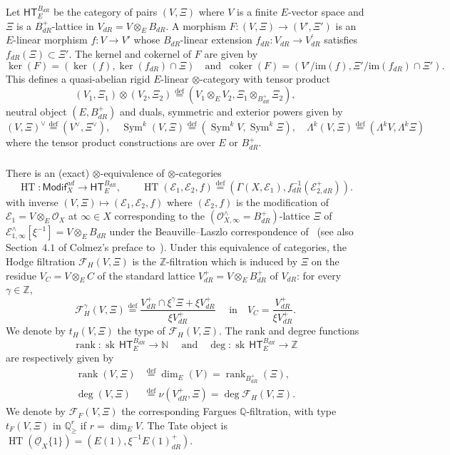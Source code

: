 \documentclass[11pt]{article}
\theoremstyle{definition}
\numberwithin{equation}{section}
\numberwithin{figure}{section}
\numberwithin{table}{section}
\newcommand{\Modif}{\mathsf{Modif}}
\newcommand{\HT}{\mathsf{HT}}
\DeclareMathOperator{\coker}{coker}
\DeclareMathOperator{\rank}{rank}
\DeclareMathOperator{\sk}{sk}
\DeclareMathOperator{\Sym}{Sym}
\DeclareMathOperator{\HTT}{HT}
\newcommand{\eqd}{\stackrel{\mathrm{def}}{=}}
\newcommand*{\dR}{dR}
\begin{document}
Let $\HT_{E}^{B_{\dR}}$ be the category of pairs $(V,\Xi)$ where $V$ is a finite $E$-vector space and $\Xi$ is a $B_{\dR}^{+}$-lattice in $V_{\dR}=V\otimes_{E}B_{\dR}$. A morphism $F:(V,\Xi)\rightarrow(V',\Xi')$ is an $E$-linear morphism $f:V\rightarrow V'$ whose $B_{\dR}$-linear extension $f_{\dR}:V_{\dR}\rightarrow V_{\dR}^{\prime}$ satisfies $f_{\dR}(\Xi)\subset\Xi'$. The kernel and cokernel of $F$ are given by
\[
\ker(F)=\left(\ker(f),\ker(f_{\dR})\cap\Xi\right)\quad\text{and}\;\;\coker(F)=\left(V'/\mathrm{im}(f),\Xi'/\mathrm{im}(f_{\dR})\cap\Xi'\right).
\]
This defines a quasi-abelian rigid $E$-linear $\otimes$-category with tensor product
\[
(V_{1},\Xi_{1})\otimes(V_{2},\Xi_{2})\eqd(V_{1}\otimes_{E}V_{2},\Xi_{1}\otimes_{B_{\dR}^{+}}\Xi_{2}),
\]
neutral object $(E,B_{\dR}^{+})$ and duals, symmetric and exterior powers given by
\[
(V,\Xi)^{\vee}\eqd(V^{\vee},\Xi^{\vee}),\quad\Sym^{k}(V,\Xi)\eqd(\Sym^{k}V,\Sym^{k}\Xi),\quad\Lambda^{k}(V,\Xi)\eqd(\Lambda^{k}V,\Lambda^{k}\Xi)
\]
where the tensor product constructions are over $E$ or $B_{\dR}^{+}$.

\subsubsection{}

There is an (exact) $\otimes$-equivalence of $\otimes$-categories~\cite[4.2.3]{Fa15}
\[
\HTT:\Modif_{X}^{ad}\rightarrow\HT_{E}^{B_{\dR}},\qquad\HTT(\mathcal{E}_{1},\mathcal{E}_{2},f)\eqd\left(\Gamma(X,\mathcal{E}_{1}),f_{\dR}^{-1}(\mathcal{E}_{2,\dR}^{+})\right).
\]
with inverse $(V,\Xi)\mapsto(\mathcal{E}_{1},\mathcal{E}_{2},f)$ where $(\mathcal{E}_{2},f)$ is the modification of $\mathcal{E}_{1}=V\otimes_{E}\mathcal{O}_{X}$ at $\infty\in X$ corresponding to the $(\mathcal{O}_{X,\infty}^{\wedge}=B_{\dR}^{+})$-lattice $\Xi$ of $\mathcal{E}_{1,\infty}^{\wedge}[\xi^{-1}]=V\otimes_{E}B_{\dR}$ under the Beauville--Laszlo correspondence of~\cite[5.3.1]{FaFo15} (see also Section~$4.1$ of Colmez's preface to~\cite{FaFo15}). Under this equivalence of categories, the Hodge filtration $\mathcal{F}_{H}(V,\Xi)$ is the $\mathbb{Z}$-filtration which is induced by $\Xi$ on the residue $V_{C}=V\otimes_{E}C$ of the standard lattice $V_{\dR}^{+}=V\otimes_{E}B_{\dR}^{+}$ of $V_{\dR}$: for every $\gamma\in\mathbb{Z}$,
\[
\mathcal{F}_{H}^{\gamma}(V,\Xi)\eqd\frac{V_{\dR}^{+}\cap\xi^{\gamma}\Xi+\xi V_{\dR}^{+}}{\xi V_{\dR}^{+}}\quad\text{ in}\quad V_{C}=\frac{V_{\dR}^{+}}{\xi V_{\dR}^{+}}.
\]
We denote by $t_{H}(V,\Xi)$ the type of $\mathcal{F}_{H}(V,\Xi)$. The rank and degree functions
\[
\rank:\sk\,\HT_{E}^{B_{\dR}}\rightarrow\mathbb{N}\quad\text{ and}\quad\deg:\sk\,\HT_{E}^{B_{\dR}}\rightarrow\mathbb{Z}
\]
are respectively given by
\[
\begin{aligned}\rank(V,\Xi) & \eqd\dim_{E}(V)=\rank_{B_{\dR}^{+}}(\Xi),\\
\deg(V,\Xi) & \eqd\nu(V_{\dR}^{+},\Xi)=\deg\mathcal{F}_{H}(V,\Xi).
\end{aligned}
\]
We denote by $\mathcal{F}_{F}(V,\Xi)$ the corresponding Fargues $\mathbb{Q}$-filtration, with type $t_{F}(V,\Xi)$ in $\mathbb{Q}_{\geq}^{r}$ if $r=\dim_{E}V$. The Tate object is $\HTT(\underline{\mathcal{O}}_{X}\{1\})=\left(E(1),\xi^{-1}E(1)_{\dR}^{+}\right)$.
\end{document}
